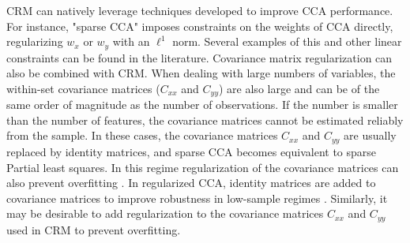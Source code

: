 \documentclass{article}
\begin{document}
CRM can natively leverage techniques developed to improve CCA performance. For instance, "sparse CCA" imposes constraints on the weights of CCA directly, regularizing $w_x$ or $w_y$ with an $\ell^1$ norm. Several examples of this and other linear constraints can be found in the literature\cite{zhuangFamilyLocallyConstrained2017,wittenPenalizedMatrixDecomposition2009,parkhomenkoSparseCanonicalCorrelation2009,tuzhilina_canonical_2023}. Covariance matrix regularization can also be combined with CRM. When dealing with large numbers of variables, the within-set covariance matrices ($C_{xx}$ and $C_{yy}$) are also large and can be of the same order of magnitude as the number of observations. If the number is smaller than the number of features, the covariance matrices cannot be estimated reliably from the sample. In these cases, the covariance matrices $C_{xx}$ and $C_{yy}$ are usually replaced by identity matrices, and sparse CCA becomes equivalent to sparse Partial least squares\cite{mihalikCanonicalCorrelationAnalysis2022}. In this regime regularization of the covariance matrices can also prevent overfitting \cite{ledoitHoneyShrunkSample2003a}. In regularized CCA, identity matrices are added to covariance matrices to improve robustness in low-sample regimes \cite{tuzhilina_canonical_2023}. Similarly, it may be desirable to add regularization to the covariance matrices $C_{xx}$ and $C_{yy}$ used in CRM to prevent overfitting.
\end{document}
